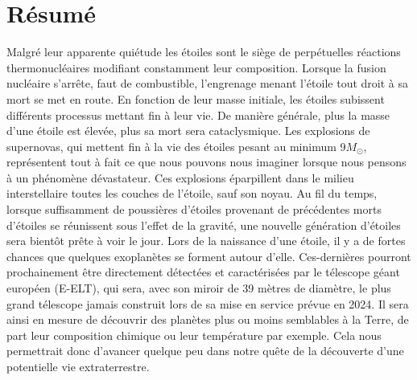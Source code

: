 
\chapter*{Résumé}
\thispagestyle{empty}

\vfill


Malgré leur apparente quiétude les étoiles sont le siège de perpétuelles réactions thermonucléaires modifiant constamment leur composition. Lorsque la fusion nucléaire s'arrête, faut de combustible, l'engrenage menant l'étoile tout droit à sa mort se met en route. En fonction de leur masse initiale, les étoiles subissent différents processus mettant fin à leur vie. De manière générale, plus la masse d'une étoile est élevée, plus sa mort sera cataclysmique. Les explosions de supernovas, qui mettent fin à la vie des étoiles pesant au minimum 9$M_\odot$, représentent tout à fait ce que nous pouvons nous imaginer lorsque nous pensons à un phénomène dévastateur. Ces explosions éparpillent dans le milieu interstellaire toutes les couches de l'étoile, sauf son noyau. Au fil du temps, lorsque suffisamment de poussières d'étoiles provenant de précédentes morts d'étoiles se réunissent sous l'effet de la gravité, une nouvelle génération d'étoiles sera bientôt prête à voir le jour. Lors de la naissance d'une étoile, il y a de fortes chances que quelques exoplanètes se forment autour d'elle. Ces-dernières pourront prochainement être directement détectées et caractérisées par le télescope géant européen (E-ELT), qui sera, avec son miroir de 39  mètres de diamètre, le plus grand télescope jamais construit lors de sa mise en service prévue en 2024. Il sera ainsi en mesure de découvrir des planètes plus ou moins semblables à la Terre, de part leur composition chimique ou leur température par exemple. Cela nous permettrait donc d'avancer quelque peu dans notre quête de la découverte d'une potentielle vie extraterrestre.




\vfill



